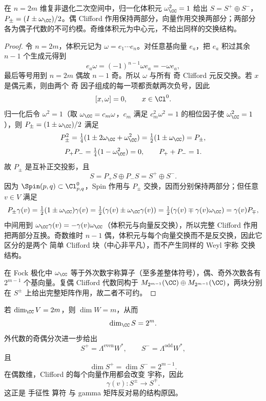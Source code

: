 \begin{proposition}[偶维旋量的手征分解]
在 $n=2m$ 维复非退化二次空间中，归一化体积元 $\omega_\CC^2=1$ 给出 $S=S^+\oplus S^-$，$P_\pm=(I\pm\omega_\CC)/2$。偶 Clifford 作用保持两部分，向量作用交换两部分；两部分各为偶子代数的不可约模。奇维体积元为中心元，不给出同样的交换结构。
\end{proposition}
\begin{proof}
令 $n=2m$，体积元记为 $\omega=e_1\cdots e_n$。对任意基向量 $e_a$，把 $e_a$ 积过其余 $n-1$ 个生成元得到
\[
e_a\omega=(-1)^{n-1}\omega e_a=-\omega e_a,
\]
最后等号用到 $n=2m$ 偶故 $n-1$ 奇。所以 $\omega$ 与所有 奇 Clifford 元反交换。若 $x$ 是偶元素，则由两个 奇 因子组成的每一项都贡献两次负号，因此
\[
[x,\omega]=0,
\qquad x\in\Cl^0.
\]
归一化后令 $\omega^2=1$（取 $\omega_\CC=c_m\omega$，$c_m$ 满足 $c_m^2\omega^2=1$ 的相位因子使 $\omega_\CC^2=1$），则 $P_\pm=(1\pm\omega_\CC)/2$ 满足
\[
P_\pm^2=\tfrac14(1\pm2\omega_\CC+\omega_\CC^2)=\tfrac12(1\pm\omega_\CC)=P_\pm,
\]
\[
P_+P_-=\tfrac14(1-\omega_\CC^2)=0,
\qquad
P_++P_-=1.
\]
故 $P_\pm$ 是互补正交投影，且
\[
S=P_+S\oplus P_-S=S^+\oplus S^-.
\]
因为 $\Spin(p,q)\subset\Cl_{p,q}^0$，Spin 作用与 $P_\pm$ 交换，因而分别保持两部分；但任意 $v\in V$ 满足
\[
P_\pm\gamma(v)=\tfrac12(1\pm\omega_\CC)\gamma(v)
=\tfrac12(\gamma(v)\pm\omega_\CC\gamma(v))
=\tfrac12(\gamma(v)\mp\gamma(v)\omega_\CC)
=\gamma(v)P_\mp,
\]
中间用到 $\omega_\CC\gamma(v)=-\gamma(v)\omega_\CC$（体积元与向量反交换），所以完整 Clifford 作用把两部分互换。奇数维时 $n-1$ 偶，体积元与每个向量交换而不是反交换，因此它区分的是两个 简单 Clifford 块（中心非平凡），而不产生同样的 Weyl 宇称 交换结构。

在 Fock 极化中 $\omega_\CC$ 等于外次数宇称算子（至多差整体符号），偶、奇外次数各有 $2^{m-1}$ 个基向量。复偶 Clifford 代数同构于 $M_{2^{m-1}}(\CC)\oplus M_{2^{m-1}}(\CC)$，两块分别在 $S^\pm$ 上给出完整矩阵作用，故二者不可约。
\end{proof}


若 $\dim_{\CC}V=2m$，则 $\dim W=m$，从而
\[
\dim_{\CC}S=2^m.
\]
外代数的奇偶分次进一步给出
\begin{equation}
S^+=\Lambda^{\mathrm{even}}W^*,
\qquad
S^-=\Lambda^{\mathrm{odd}}W^*,
\label{eq:spinor-fock-chirality}
\end{equation}
且
\[
\dim S^+=\dim S^-=2^{m-1}.
\]
在偶数维，Clifford 的每个向量作用都会改变 宇称，因此
\[
\gamma(v):S^\pm\to S^\mp.
\]
这正是 手征性 算符 与 gamma 矩阵反对易的结构原因。

